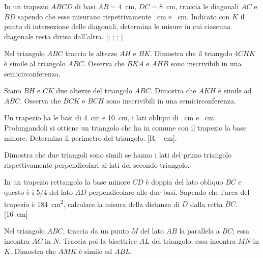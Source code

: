 \begin{multicols}{2}
\begin{esercizio}
\label{ese:6.64}
In un trapezio $ABCD$ di basi $AB=4$~cm, $DC=8$~cm, traccia le diagonali $AC$ e $BD$ sapendo che esse misurano rispettivamente ~cm e ~cm. Indicato con $K$ il punto di intersezione delle diagonali, determina le misure in cui ciascuna diagonale resta divisa dall'altra. [; ; ; ]
\end{esercizio}

\begin{esercizio}
\label{ese:6.65}
Nel triangolo $ABC$ traccia le altezze $AH$ e $BK$. Dimostra che il triangolo $4CHK$ è simile al triangolo $ABC$. Osserva che $BKA$ e $AHB$ sono inscrivibili in una semicirconferenza.
\end{esercizio}

\begin{esercizio}
\label{ese:6.66}
Siano $BH$ e $CK$ due altezze del triangolo $ABC$. Dimostra che $AKH$ è simile ad $ABC$. Osserva che $BCK$ e $BCH$ sono inscrivibili in una semicirconferenza.
\end{esercizio}

\begin{esercizio}
\label{ese:6.67}
Un trapezio ha le basi di 4~cm e 10~cm, i lati obliqui di ~cm e ~cm. Prolungandoli si ottiene un triangolo che ha in comune con il trapezio la base minore. Determina il perimetro del triangolo. [R.~~cm].
\end{esercizio}

\begin{esercizio}
\label{ese:6.68}
Dimostra che due triangoli sono simili se hanno i lati del primo triangolo rispettivamente perpendicolari ai lati del secondo triangolo. 
\end{esercizio}

\begin{esercizio}
\label{ese:6.69}
In un trapezio rettangolo la base minore $CD$ è doppia del lato obliquo $BC$ e questo è i $5/4$ del lato $AD$ perpendicolare alle due basi. Sapendo che l'area del trapezio è 184~cm\textsuperscript{2}, calcolare la misura della distanza di $D$ dalla retta $BC$. [16~cm] 
\end{esercizio}

\begin{esercizio}
\label{ese:6.70}
Nel triangolo $ABC$, traccia da un punto $M$ del lato $AB$ la parallela a $BC$; essa incontra $AC$ in $N$. Traccia poi la bisettrice $AL$ del triangolo; essa incontra $MN$ in $K$. Dimostra che $AMK$ è simile ad $ABL$.
\end{esercizio}


\end{multicols}
